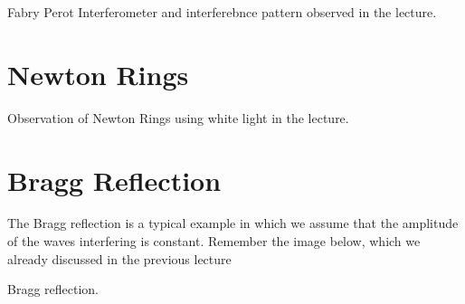 \documentclass[letterpaper,10pt,english]{sphinxmanual}
\begin{document}
 



 Fabry Perot Interferometer and interferebnce pattern observed in the lecture.






\section{Newton Rings}
\label{\detokenize{notebooks/L11/Interference:Newton-Rings}}





 Observation of Newton Rings using white light in the lecture.






\section{Bragg Reflection}
\label{\detokenize{notebooks/L11/Interference:Bragg-Reflection}}
The Bragg reflection is a typical example in which we assume that the amplitude of the waves interfering is constant. Remember the image below, which we already discussed in the previous lecture






 Bragg reflection.
\end{document}
